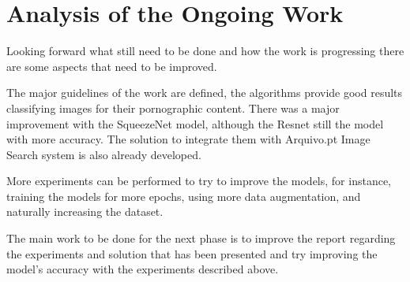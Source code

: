 \chapter{Analysis of the Ongoing Work}



Looking forward what still need to be done and how the work is progressing there are some aspects that need to be improved.

The major guidelines of the work are defined, the algorithms provide good results classifying images for their pornographic content. There was a major improvement with the SqueezeNet model, although the Resnet still the model with more accuracy. The solution to integrate them with Arquivo.pt Image Search system is also already developed.

More experiments can be performed to try to improve the models, for instance, training the models for more epochs, using more data augmentation, and naturally increasing the dataset.

The main work to be done for the next phase is to improve the report regarding the experiments and solution that has been presented and try improving the model's accuracy with the experiments described above.